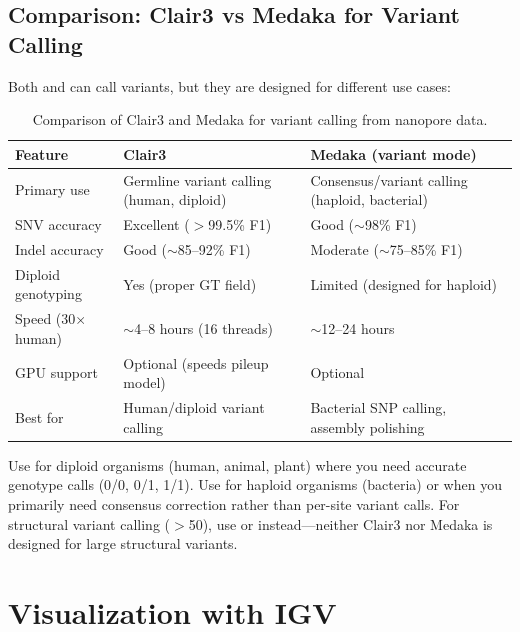 \subsection{Comparison: Clair3 vs Medaka for Variant Calling}
\label{subsec:diyanalysis:clair3_vs_medaka}

Both  and  can call variants, but they are designed for different use cases:

\begin{table}[htbp]
\centering
\caption{Comparison of Clair3 and Medaka for variant calling from nanopore data.}
\label{tab:diy_clair3_medaka}
\begin{tabularx}{\textwidth}{@{}lXX@{}}
\toprule
\textbf{Feature} & \textbf{Clair3} & \textbf{Medaka (variant mode)} \\
\midrule
Primary use & Germline variant calling (human, diploid) & Consensus/variant calling (haploid, bacterial) \\
SNV accuracy & Excellent ($>$99.5\% F1) & Good ($\sim$98\% F1) \\
Indel accuracy & Good ($\sim$85--92\% F1) & Moderate ($\sim$75--85\% F1) \\
Diploid genotyping & Yes (proper GT field) & Limited (designed for haploid) \\
Speed (30$\times$ human) & $\sim$4--8 hours (16 threads) & $\sim$12--24 hours \\
GPU support & Optional (speeds pileup model) & Optional \\
Best for & Human/diploid variant calling & Bacterial SNP calling, assembly polishing \\
\bottomrule
\end{tabularx}
\end{table}

\begin{keyconcept}[title={Rule of Thumb for Variant Caller Selection}]
Use  for diploid organisms (human, animal, plant) where you need accurate genotype calls (0/0, 0/1, 1/1). Use  for haploid organisms (bacteria) or when you primarily need consensus correction rather than per-site variant calls. For structural variant calling ($>$50\basepair{}), use  or  instead---neither Clair3 nor Medaka is designed for large structural variants.
\end{keyconcept}

\section{Visualization with IGV}
\label{sec:diyanalysis:igv}

